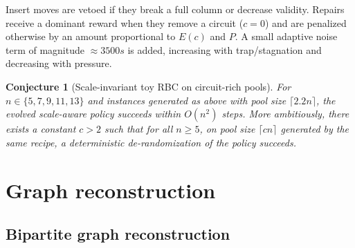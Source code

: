 \documentclass[11pt]{amsart}
\newtheorem{conjecture}{Conjecture}
\begin{document}
Insert moves are vetoed if they break a full column or decrease validity.
Repairs receive a dominant reward when they remove a circuit ($c=0$) and are penalized otherwise by an amount proportional to $E(c)$ and $P$.
A small adaptive noise term of magnitude $\approx 3500s$ is added, increasing with trap/stagnation and decreasing with pressure.

\begin{conjecture}[Scale-invariant toy RBC on circuit-rich pools]
\label{conj:scaling}
For $n\in\{5,7,9,11,13\}$ and instances generated as above with pool size $\lceil 2.2n\rceil$, the evolved scale-aware policy succeeds within $O(n^2)$ steps.
More ambitiously, there exists a constant $c>2$ such that for all $n\ge 5$, on pool size $\lceil cn\rceil$ generated by the same recipe, a deterministic de-randomization of the policy succeeds.
\end{conjecture}

\appendix 
\section{Graph reconstruction}
\label{app:graph}
\subsection{Bipartite graph reconstruction} 
\end{document}
